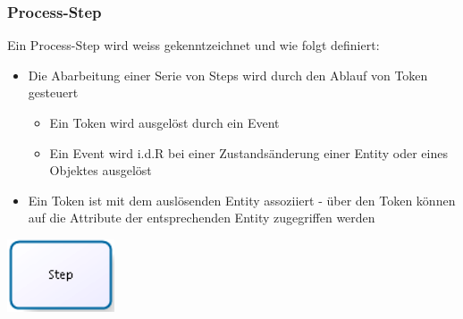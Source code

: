 \subsubsection{Process-Step}
\begin{minipage}[t]{0.7\textwidth}
Ein Process-Step wird weiss gekenntzeichnet und wie folgt definiert:
\begin{itemize}
    \item Die Abarbeitung einer Serie von Steps wird durch den Ablauf von Token gesteuert
    \begin{itemize}
        \item Ein Token wird ausgelöst durch ein Event
        \item Ein Event wird i.d.R bei einer Zustandsänderung einer Entity oder eines Objektes ausgelöst
    \end{itemize}
    \item Ein Token ist mit dem auslösenden Entity assoziiert - über den Token können auf die Attribute der entsprechenden Entity zugegriffen werden
\end{itemize}
\end{minipage}
\begin{minipage}[t]{0.2\textwidth}
\includegraphics[width=0.6\linewidth]{images/simBPMN_process-step.png}
\end{minipage}

